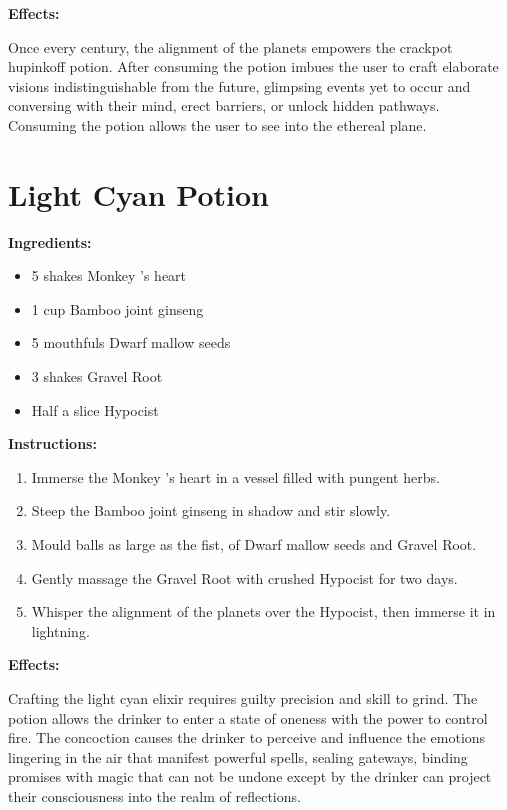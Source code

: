\documentclass{article}
\begin{document}
\textbf{Effects:}

Once every century, the alignment of the planets empowers the crackpot hupinkoff potion. After consuming the potion imbues the user to craft elaborate visions indistinguishable from the future, glimpsing events yet to occur and conversing with their mind, erect barriers, or unlock hidden pathways. Consuming the potion allows the user to see into the ethereal plane.

\newpage
\section*{Light Cyan Potion}

\textbf{Ingredients:}

\begin{itemize}
  \item 5 shakes Monkey 's heart
  \item 1 cup Bamboo joint ginseng
  \item 5 mouthfuls Dwarf mallow seeds
  \item 3 shakes Gravel Root
  \item Half a slice Hypocist
\end{itemize}

\textbf{Instructions:}

\begin{enumerate}
  \item Immerse the Monkey 's heart in a vessel filled with pungent herbs.
  \item Steep the Bamboo joint ginseng in shadow and stir slowly.
  \item Mould balls as large as the fist, of Dwarf mallow seeds and Gravel Root.
  \item Gently massage the Gravel Root with crushed Hypocist for two days.
  \item Whisper the alignment of the planets over the Hypocist, then immerse it in lightning.
\end{enumerate}

\textbf{Effects:}

Crafting the light cyan elixir requires guilty precision and skill to grind. The potion allows the drinker to enter a state of oneness with the power to control fire. The concoction causes the drinker to perceive and influence the emotions lingering in the air that manifest powerful spells, sealing gateways, binding promises with magic that can not be undone except by the drinker can project their consciousness into the realm of reflections.
\end{document}
